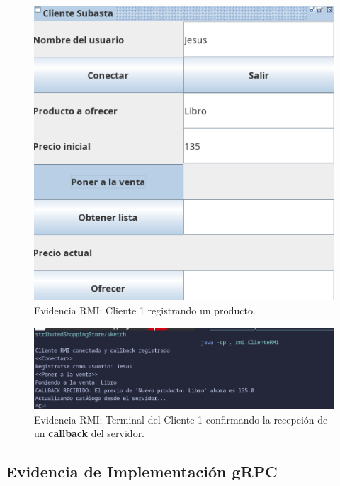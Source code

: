 \documentclass[11pt, a4paper]{article}
\begin{document}
\begin{figure}[h!]
    \centering
    \includegraphics[width=0.7\linewidth]{media/rmi-screenshots/Sell-Item-Client1.png}
    \caption{Evidencia RMI: Cliente 1 registrando un producto.}
\end{figure}

\begin{figure}[h!]
    \centering
    \includegraphics[width=0.9\linewidth]{media/rmi-screenshots/Sell-Item-Terminal-Client-1.png}
    \caption{Evidencia RMI: Terminal del Cliente 1 confirmando la recepción de un \textbf{callback} del servidor.}
\end{figure}

\subsection{Evidencia de Implementación gRPC}
\end{document}

